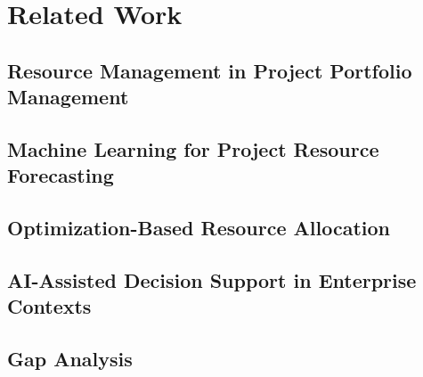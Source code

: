 \chapter{Related Work}
\label{chap:related_work}

\section{Resource Management in Project Portfolio Management}
\label{sec:rw_ppm}


\section{Machine Learning for Project Resource Forecasting}
\label{sec:rw_ml_forecasting}


\section{Optimization-Based Resource Allocation}
\label{sec:rw_optimization}


\section{AI-Assisted Decision Support in Enterprise Contexts}
\label{sec:rw_dss}


\section{Gap Analysis}
\label{sec:rw_gap}


